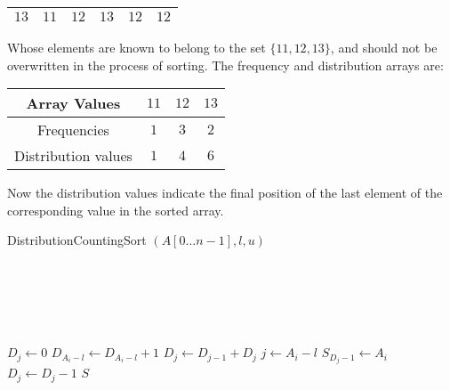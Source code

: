 \documentclass[12pt letter]{report}
\begin{document}
\begin{table}[H]

  \centering
  \begin{tabular}{|c|c|c|c|c|c|}
    \hline
    $13$ & $11$ & $12$ & $13$ & $12$ & $12$ \\
    \hline
  \end{tabular}
\end{table}
Whose elements are known to belong to the set $\{11, 12, 13\} $, and should not be overwritten in the process of
sorting. The frequency and distribution arrays are:
\begin{table}[H]
  \centering
  \begin{tabular}{c c c c}
    \hline
    Array Values        & $11$ & $12$ & $13$ \\
    \hline
    Frequencies         & $1$  & $3$  & $2$  \\
    Distribution values & $1$  & $4$  & $6$  \\
    \hline
  \end{tabular}
\end{table}
Now the distribution values indicate the final position of the last element of the corresponding value in the sorted
array.

\begin{algorithm}[H]
  \caption{DistributionCountingSort $ \left( A \left[ 0 \ldots n - 1 \right], l, u \right) $}
  \Comment{}\\
   \\
   \\
   \\
  \begin{algorithmic}[1]
    \State $D_j \gets 0$ 
    \EndFor
    \State  $D_{A_i - l} \gets D_{A_i - l} + 1$ 
    \EndFor
    \State  $D_j \gets D_{j- 1} + D_j$
    \EndFor
    \State $j \gets A_i - l$
    \State $S_{D_j - 1} \gets A_i$
    \State $D_j \gets D_j - 1$
    \EndFor
    \State \Return $S$
  \end{algorithmic}
\end{algorithm}
\end{document}
